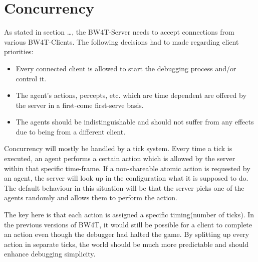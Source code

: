 \section{Concurrency}
As stated in section \dots, the BW4T-Server needs to accept connections from
various BW4T-Clients.  The following decisions had to made regarding client
priorities:

\begin{itemize}
  \item Every connected client is allowed to start the debugging process and/or
    control it.
  \item The agent's actions, percepts, etc. which are time dependent are
    offered by the server in a first-come first-serve basis.
  \item The agents should be indistinguishable and should not suffer from any
    effects due to being from a different client.
\end{itemize}

Concurrency will mostly be handled by a tick system. Every time a tick is
executed, an agent performs a certain action which is allowed by the server
within that specific time-frame. If a non-shareable atomic action is requested
by an agent, the server will look up in the configuration what it is supposed
to do. The default behaviour in this situation will be that the server picks
one of the agents randomly and allows them to perform the action.

The key here is that each action is assigned a specific timing(number of
ticks). In the previous versions of BW4T, it would still be possible for a
client to complete an action even though the debugger had halted the game. By
splitting up every action in separate ticks, the world should be much more
predictable and should enhance debugging simplicity.

